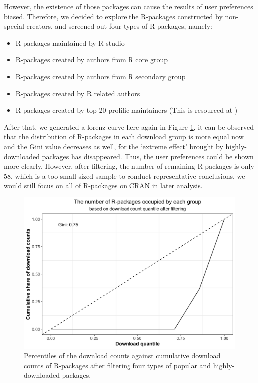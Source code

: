 \documentclass[
]{book}
\providecommand{\tightlist}{%
  \setlength{\itemsep}{0pt}\setlength{\parskip}{0pt}}
\begin{document}
However, the existence of those packages can cause the results of user preferences biased. Therefore, we decided to explore the R-packages constructed by non-special creators, and screened out four types of R-packages, namely:

\begin{itemize}
\tightlist
\item
  R-packages maintained by R studio
\item
  R-packages created by authors from R core group
\item
  R-packages created by authors from R secondary group
\item
  R-packages created by R related authors
\item
  R-packages created by top 20 prolific maintainers (This is resourced at \textcite{revolutions})
\end{itemize}

After that, we generated a lorenz curve here again in Figure \ref{fig:lorenz-filter}, it can be observed that the distribution of R-packages in each download group is more equal now and the Gini value decreases as well, for the `extreme effect' brought by highly-downloaded packages has disappeared. Thus, the user preferences could be shown more clearly. However, after filtering, the number of remaining R-packages is only 58, which is a too small-sized sample to conduct representative conclusions, we would still focus on all of R-packages on CRAN in later analysis.



\begin{figure}

{\centering \includegraphics{figures/lorenz-filter-1} 

}

\caption{Percentiles of the download counts against cumulative download counts of R-packages after filtering four types of popular and highly-downloaded packages.}\label{fig:lorenz-filter}
\end{figure}
\end{document}
